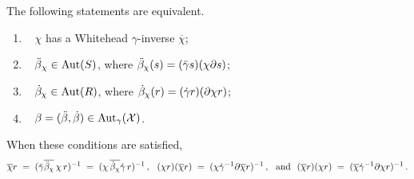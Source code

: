 \begin{lem} \label{lem:chi-sigma-rho}
The following statements are equivalent.
\begin{enumerate}[{\rm (i)}]
\item~ 
$\chi$ has a Whitehead $\gamma$-inverse $\overline{\chi}$; 
\item~ 
$\ddot{\beta}{_\chi} \in \mathrm{Aut}(S)$, 
where $\ddot{\beta}_{\chi}(s) = (\ddot{\gamma} s)(\chi \partial s)$;
\item~ 
$\dot{\beta}_{\chi} \in \mathrm{Aut}(R)$,
where $\dot{\beta}_{\chi}(r) = (\dot{\gamma} r)(\partial \chi r)$;
\item~
$\beta = (\ddot{\beta},\dot{\beta}) \in \mathrm{Aut}_{\gamma}(\mathcal{X})$.
\end{enumerate}
When these conditions are satisfied, 
$$
\overline{\chi}r \;=\; ({\ddot{\gamma}\overline{\ddot{\beta}_{\chi}}}\,\chi\,r)^{-1}
                 \;=\; (\chi\,\overline{\dot{\beta}_{\chi}}\dot{\gamma}\,r)^{-1}\,,~~  
(\chi r)(\overline{\chi}r) \;=\; 
(\chi \dot{\gamma}^{-1} \partial \overline{\chi}r)^{-1}\,,
~~\text{and}~~ 
(\overline{\chi}r)(\chi r) \;=\; 
(\overline{\chi} \dot{\gamma}^{-1} \partial \chi r)^{-1}\,. 
$$
\end{lem}

